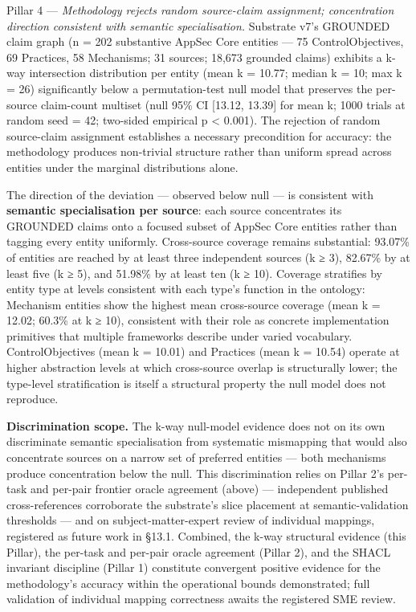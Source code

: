 \documentclass[
]{article}
\begin{document}
Pillar 4 --- \emph{Methodology rejects random source-claim assignment;
concentration direction consistent with semantic specialisation.}
Substrate v7's GROUNDED claim graph (n = 202 substantive AppSec Core
entities --- 75 ControlObjectives, 69 Practices, 58 Mechanisms; 31
sources; 18,673 grounded claims) exhibits a k-way intersection
distribution per entity (mean k = 10.77; median k = 10; max k = 26)
significantly below a permutation-test null model that preserves the
per-source claim-count multiset (null 95\% CI {[}13.12, 13.39{]} for
mean k; 1000 trials at random seed = 42; two-sided empirical p
\textless{} 0.001). The rejection of random source-claim assignment
establishes a necessary precondition for accuracy: the methodology
produces non-trivial structure rather than uniform spread across
entities under the marginal distributions alone.

The direction of the deviation --- observed below null --- is consistent
with \textbf{semantic specialisation per source}: each source
concentrates its GROUNDED claims onto a focused subset of AppSec Core
entities rather than tagging every entity uniformly. Cross-source
coverage remains substantial: 93.07\% of entities are reached by at
least three independent sources (k ≥ 3), 82.67\% by at least five (k ≥
5), and 51.98\% by at least ten (k ≥ 10). Coverage stratifies by entity
type at levels consistent with each type's function in the ontology:
Mechanism entities show the highest mean cross-source coverage (mean k =
12.02; 60.3\% at k ≥ 10), consistent with their role as concrete
implementation primitives that multiple frameworks describe under varied
vocabulary. ControlObjectives (mean k = 10.01) and Practices (mean k =
10.54) operate at higher abstraction levels at which cross-source
overlap is structurally lower; the type-level stratification is itself a
structural property the null model does not reproduce.

\textbf{Discrimination scope.} The k-way null-model evidence does not on
its own discriminate semantic specialisation from systematic mismapping
that would also concentrate sources on a narrow set of preferred
entities --- both mechanisms produce concentration below the null. This
discrimination relies on Pillar 2's per-task and per-pair frontier
oracle agreement (above) --- independent published cross-references
corroborate the substrate's slice placement at semantic-validation
thresholds --- and on subject-matter-expert review of individual
mappings, registered as future work in §13.1. Combined, the k-way
structural evidence (this Pillar), the per-task and per-pair oracle
agreement (Pillar 2), and the SHACL invariant discipline (Pillar 1)
constitute convergent positive evidence for the methodology's accuracy
within the operational bounds demonstrated; full validation of
individual mapping correctness awaits the registered SME review.
\end{document}
